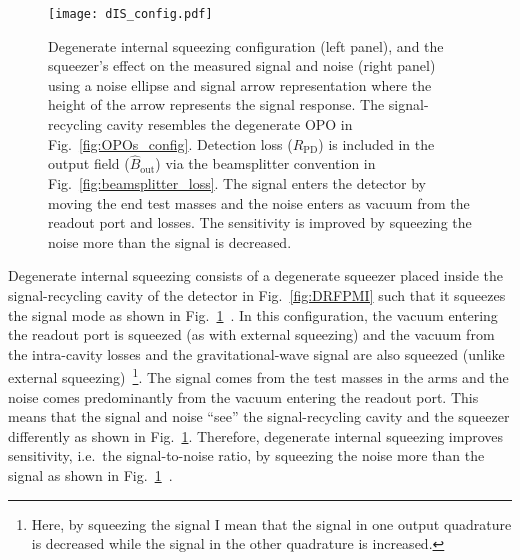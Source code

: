 \begin{figure}[ht]
	\centering
	\texttt{[image: dIS\_config.pdf]}
	\caption{Degenerate internal squeezing configuration (left panel), and the squeezer's effect on the measured signal and noise (right panel) using a noise ellipse and signal arrow representation where the height of the arrow represents the signal response. The signal-recycling cavity resembles the degenerate OPO in Fig.~\ref{fig:OPOs_config}. Detection loss ($R_\text{PD}$) is included in the output field ($\hat{B}_\text{out}$) via the beamsplitter convention in Fig.~\ref{fig:beamsplitter_loss}. The signal enters the detector by moving the end test masses and the noise enters as vacuum from the readout port and losses. The sensitivity is improved by squeezing the noise more than the signal is decreased.}
	\label{fig:dIS_config}
\end{figure}

Degenerate internal squeezing consists of a degenerate squeezer placed inside the signal-recycling cavity of the detector in Fig.~\ref{fig:DRFPMI} such that it squeezes the signal mode as shown in Fig.~\ref{fig:dIS_config}~\cite{korobkoQuantumExpanderGravitationalwave2019}. In this configuration, the vacuum entering the readout port is squeezed (as with external squeezing) and the vacuum from the intra-cavity losses and the gravitational-wave signal are also squeezed (unlike external squeezing)~\footnote{Here, by squeezing the signal I mean that the signal in one output quadrature is decreased while the signal in the other quadrature is increased.}.
The signal comes from the test masses in the arms and the noise comes predominantly from the vacuum entering the readout port. This means that the signal and noise ``see'' the signal-recycling cavity and the squeezer differently as shown in Fig.~\ref{fig:dIS_config}. %
Therefore, degenerate internal squeezing improves sensitivity, i.e.\ the signal-to-noise ratio, by squeezing the noise more than the signal as shown in Fig.~\ref{fig:dIS_config}~\cite{korobkoQuantumExpanderGravitationalwave2019}.


